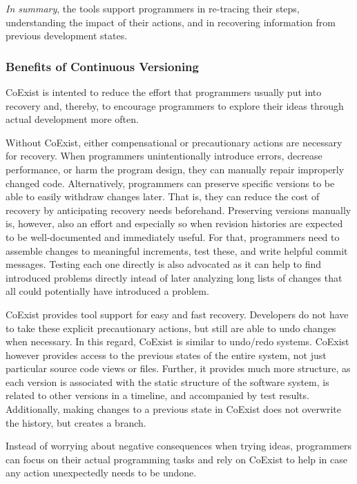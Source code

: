 \emph{In summary}, the tools support programmers in re-tracing their steps, understanding the impact of their actions, and in recovering information from previous development states.


\subsubsection{Benefits of Continuous Versioning}

CoExist is intented to reduce the effort that programmers usually put into recovery and, thereby, to encourage programmers to explore their ideas through actual development more often.

Without CoExist, either compensational or precautionary actions are necessary for recovery.
When programmers unintentionally introduce errors, decrease performance, or harm the program design, they can manually repair improperly changed code.
Alternatively, programmers can preserve specific versions to be able to easily withdraw changes later.
That is, they can reduce the cost of recovery by anticipating recovery needs beforehand.
Preserving versions manually is, however, also an effort and especially so when revision histories are expected to be well-documented and immediately useful.
For that, programmers need to assemble changes to meaningful increments, test these, and write helpful commit messages.
Testing each one directly is also advocated as it can help to find introduced problems directly intead of later analyzing long lists of changes that all could potentially have introduced a problem.

CoExist provides tool support for easy and fast recovery.
Developers do not have to take these explicit precautionary actions, but still are able to undo changes when necessary.
In this regard, CoExist is similar to undo/redo systems.
CoExist however provides access to the previous states of the entire system, not just particular source code views or files.
Further, it provides much more structure, as each version is associated with the static structure of the software system, is related to other versions in a timeline, and accompanied by test results.
Additionally, making changes to a previous state in CoExist does not overwrite the history, but creates a branch.

Instead of worrying about negative consequences when trying ideas, programmers can focus on their actual programming tasks and rely on CoExist to help in case any action unexpectedly needs to be undone.


